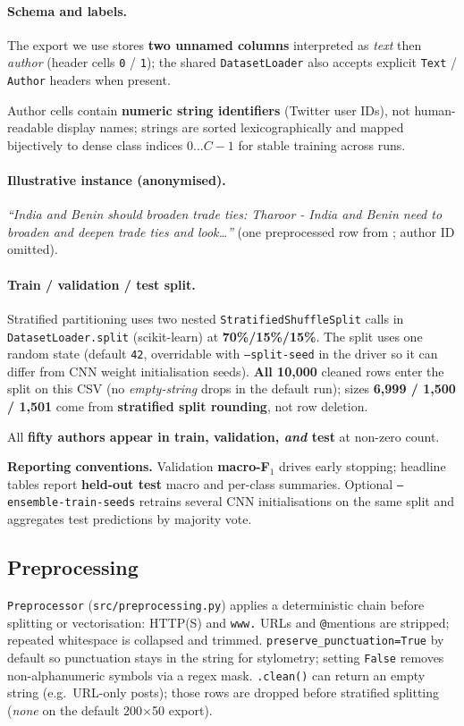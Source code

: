 \documentclass[11pt]{article}
\begin{document}
\paragraph{Schema and labels.}
The export we use stores \textbf{two unnamed columns} interpreted as \emph{text} then \emph{author} (header cells \texttt{0} / \texttt{1}); the shared \texttt{DatasetLoader} also accepts explicit \texttt{Text} / \texttt{Author} headers when present.

Author cells contain \textbf{numeric string identifiers} (Twitter user IDs), not human-readable display names; strings are sorted lexicographically and mapped bijectively to dense class indices \(0\ldots C{-}1\) for stable training across runs.

\paragraph{Illustrative instance (anonymised).}
\textit{``India and Benin should broaden trade ties: Tharoor - India and Benin need to broaden and deepen trade ties and look\ldots''} (one preprocessed row from ; author ID omitted).

\paragraph{Train / validation / test split.}
Stratified partitioning uses two nested \texttt{StratifiedShuffleSplit} calls in \texttt{DatasetLoader.split} (scikit-learn) at \textbf{70\%/15\%/15\%}.
The split uses one random state (default \texttt{42}, overridable with \texttt{--split-seed} in the driver so it can differ from CNN weight initialisation seeds).
\textbf{All 10{,}000} cleaned rows enter the split on this CSV (no \emph{empty-string} drops in the default run); sizes \textbf{6{,}999 / 1{,}500 / 1{,}501} come from \textbf{stratified split rounding}, not row deletion.

All \textbf{fifty authors appear in train, validation, \emph{and} test} at non-zero count.

\textbf{Reporting conventions.} Validation \textbf{macro-F$_1$} drives early stopping; headline tables report \textbf{held-out test} macro and per-class summaries. Optional \texttt{--ensemble-train-seeds} retrains several CNN initialisations on the same split and aggregates test predictions by majority vote.

\subsection{Preprocessing}
\label{sec:preprocessing}
\texttt{Preprocessor} (\texttt{src/preprocessing.py}) applies a deterministic chain before splitting or vectorisation: HTTP(S) and \texttt{www.} URLs and \texttt{@}mentions are stripped; repeated whitespace is collapsed and trimmed.
\texttt{preserve\_punctuation=True} by default so punctuation stays in the string for stylometry; setting \texttt{False} removes non-alphanumeric symbols via a regex mask.
\texttt{.clean()} can return an empty string (e.g.\ URL-only posts); those rows are dropped before stratified splitting (\emph{none} on the default 200$\times$50 export).
\end{document}
